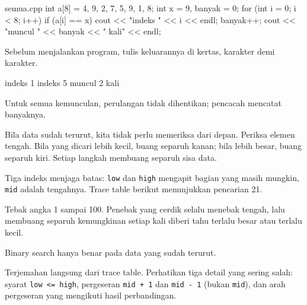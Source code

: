 \documentclass[a4paper]{article}
\begin{document}
\begin{MKode}{semua.cpp}
int a[8] = {4, 9, 2, 7, 5, 9, 1, 8};
int x = 9, banyak = 0;
for (int i = 0; i < 8; i++) {
    if (a[i] == x) {
        cout << "indeks " << i << endl;
        banyak++;
    }
}
cout << "muncul " << banyak << " kali" << endl;
\end{MKode}
\begin{Tebak}[]
Sebelum menjalankan program, tulis keluarannya di kertas, karakter demi karakter.
\end{Tebak}
\begin{Jawaban}[]
\begin{MKeluaran}[]
indeks 1
indeks 5
muncul 2 kali
\end{MKeluaran}
Untuk semua kemunculan, perulangan tidak dihentikan; pencacah mencatat banyaknya.
\end{Jawaban}
Bila data sudah terurut, kita tidak perlu memeriksa dari depan. Periksa elemen tengah. Bila yang dicari lebih kecil, buang separuh kanan; bila lebih besar, buang separuh kiri. Setiap langkah membuang separuh sisa data.

Tiga indeks menjaga batas: \texttt{low} dan \texttt{high} mengapit bagian yang masih mungkin, \texttt{mid} adalah tengahnya. Trace table berikut menunjukkan pencarian 21.

\begin{Contoh}
Tebak angka 1 sampai 100. Penebak yang cerdik selalu menebak tengah, lalu membuang separuh kemungkinan setiap kali diberi tahu terlalu besar atau terlalu kecil.
\end{Contoh}
\par\vspace{4pt}\par\vspace{6pt}
\begin{Penting}[]
Binary search hanya benar pada data yang sudah terurut.
\end{Penting}
Terjemahan langsung dari trace table. Perhatikan tiga detail yang sering salah: syarat \texttt{low <= high}, pergeseran \texttt{mid + 1} dan \texttt{mid - 1} (bukan \texttt{mid}), dan arah pergeseran yang mengikuti hasil perbandingan.
\end{document}

